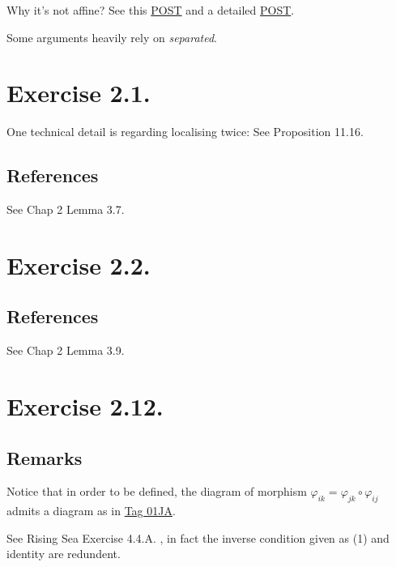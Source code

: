 Why it's not affine? See this \href{https://mathoverflow.net/questions/87480/explanation-on-a-scheme-which-is-not-affine-scheme}{POST} and a detailed \href{https://math.stackexchange.com/questions/4281800/example-of-scheme-which-is-not-an-affine-scheme}{POST}. 

Some arguments heavily rely on \textit{separated}.

\section{Exercise 2.1.}\label{Hart Ex 2.1.}

One technical detail is regarding localising twice: See \cite{altman2013term} Proposition 11.16.

\subsection{References}

See \cite{qing2006algebraic} Chap 2 Lemma 3.7. 

\section{Exercise 2.2.}

\subsection{References}

See \cite{qing2006algebraic} Chap 2 Lemma 3.9.

\section{Exercise 2.12.}

\subsection{Remarks}

Notice that in order to be defined, the diagram of morphism $\varphi_{ik}=\varphi_{jk}\circ\varphi_{ij}$ admits a diagram as in \href{https://stacks.math.columbia.edu/tag/01JA}{Tag 01JA}.

See Rising Sea Exercise 4.4.A. , in fact the inverse condition given as (1) and identity are redundent.